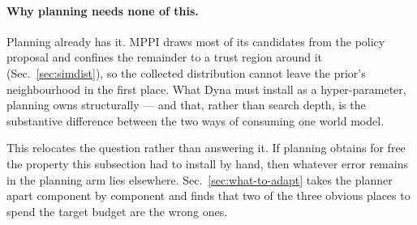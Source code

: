 \paragraph{Why planning needs none of this.}
Planning already has it. MPPI draws most of its candidates from the policy
proposal and confines the remainder to a trust region around it
(Sec.~\ref{sec:simdist}), so the collected distribution cannot leave the
prior's neighbourhood in the first place. What Dyna must install as a
hyper-parameter, planning owns structurally --- and that, rather than search
depth, is the substantive difference between the two ways of consuming one
world model.

This relocates the question rather than answering it. If planning obtains for
free the property this subsection had to install by hand, then whatever error
remains in the planning arm lies elsewhere.
Sec.~\ref{sec:what-to-adapt} takes the planner apart component by component and
finds that two of the three obvious places to spend the target budget are the
wrong ones.

